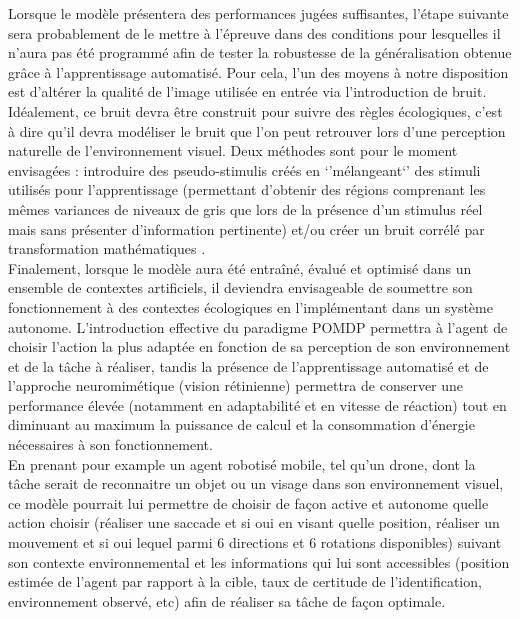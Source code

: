Lorsque le modèle présentera des performances jugées suffisantes, l'étape suivante sera probablement de le mettre à l'épreuve dans des conditions pour lesquelles il n'aura pas été programmé afin de tester la robustesse de la généralisation obtenue grâce à l'apprentissage automatisé. Pour cela, l'un des moyens à notre disposition est d'altérer la qualité de l'image utilisée en entrée via l'introduction de bruit. 
Idéalement, ce bruit devra être construit pour suivre des règles écologiques, c'est à dire qu'il devra modéliser le bruit que l'on peut retrouver lors d'une perception naturelle de l'environnement visuel. Deux méthodes sont pour le moment envisagées : introduire des pseudo-stimulis créés en `'mélangeant`' des stimuli utilisés pour l'apprentissage (permettant d'obtenir des régions comprenant les mêmes variances de niveaux de gris que lors de la présence d'un stimulus réel mais sans présenter d'information pertinente) et/ou créer un bruit corrélé par transformation mathématiques \autocite{Najemnik2005}. \\

Finalement, lorsque le modèle aura été entraîné, évalué et optimisé dans un ensemble de contextes artificiels, il deviendra envisageable de soumettre son fonctionnement à des contextes écologiques en l'implémentant dans un système autonome.
L'introduction effective du paradigme POMDP permettra à l'agent de choisir l'action la plus adaptée en fonction de sa perception de son environnement et de la tâche à réaliser, tandis la présence de l'apprentissage automatisé et de l'approche neuromimétique (vision rétinienne) permettra de conserver une performance élevée (notamment en adaptabilité et en vitesse de réaction) tout en diminuant au maximum la puissance de calcul et la consommation d'énergie nécessaires à son fonctionnement. \autocite{Potthast2016} \\
En prenant pour example un agent robotisé mobile, tel qu'un drone, dont la tâche serait de reconnaitre un objet ou un visage dans son environnement visuel, ce modèle pourrait lui permettre de choisir de façon active et autonome quelle action choisir (réaliser une saccade et si oui en visant quelle position, réaliser un mouvement et si oui lequel parmi 6 directions et 6 rotations disponibles) suivant son contexte environnemental et les informations qui lui sont accessibles (position estimée de l'agent par rapport à la cible, taux de certitude de l'identification, environnement observé, etc) afin de réaliser sa tâche de façon optimale. \autocite{Potthast2016} \\